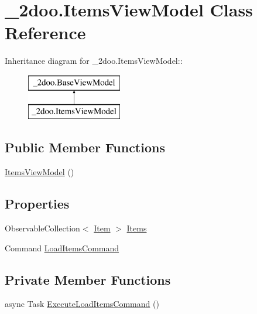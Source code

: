 \hypertarget{class__2doo_1_1_items_view_model}{
\section{\_\-2doo.ItemsViewModel Class Reference}
\label{class__2doo_1_1_items_view_model}
}
Inheritance diagram for \_\-2doo.ItemsViewModel::\begin{figure}[H]
\begin{center}
\leavevmode
\includegraphics[height=2cm]{class__2doo_1_1_items_view_model}
\end{center}
\end{figure}
\subsection*{Public Member Functions}
\begin{CompactItemize}
\item 
\hyperlink{class__2doo_1_1_items_view_model_4281e06f54ab11377669d674cf63ce82}{ItemsViewModel} ()
\end{CompactItemize}
\subsection*{Properties}
\begin{CompactItemize}
\item 
ObservableCollection$<$ \hyperlink{class__2doo_1_1_item}{Item} $>$ \hyperlink{class__2doo_1_1_items_view_model_5cf46569e45e89891546f1eaeff55ba3}{Items}
\item 
Command \hyperlink{class__2doo_1_1_items_view_model_cc5e5c6cb7dd40801dbdbaf659adffc9}{LoadItemsCommand}
\end{CompactItemize}
\subsection*{Private Member Functions}
\begin{CompactItemize}
\item 
async Task \hyperlink{class__2doo_1_1_items_view_model_09ec826f5a7c85a5649d9565fc670f5d}{ExecuteLoadItemsCommand} ()
\end{CompactItemize}


